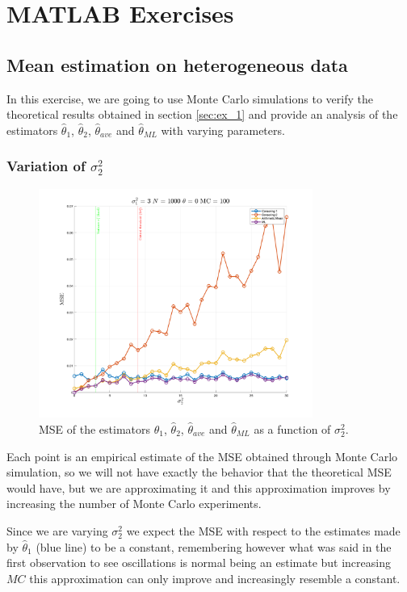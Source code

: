 \chapter{MATLAB Exercises}
\section{Mean estimation on heterogeneous data}
In this exercise, we are going to use Monte Carlo simulations to verify the theoretical results obtained in section \ref{sec:ex_1} and provide an analysis of the estimators $\hat\theta_1$, $\hat\theta_2$, $\hat\theta_{ave}$ and $\hat\theta_{ML}$ with varying parameters.

\subsection*{Variation of $\sigma_2^2$}
\begin{figure}[H]
    \centering
    \includegraphics[width=0.8\textwidth]{./figures/appendix_a/figure_1.png}
    \caption{MSE of the estimators $\hat\theta_1$, $\hat\theta_2$, $\hat\theta_{ave}$ and $\hat\theta_{ML}$ as a function of $\sigma_2^2$.}
    \label{fig:mean_estimation_heterogeneous_data}
\end{figure}

Each point is an empirical estimate of the MSE obtained through Monte Carlo simulation, so we will not have exactly the behavior that the theoretical MSE would have, but we are approximating it and this approximation improves by increasing the number of Monte Carlo experiments.

Since we are varying $\sigma_2^2$ we expect the MSE with respect to the estimates made by $\hat \theta _1$ (blue line) to be a constant, remembering however what was said in the first observation to see oscillations is normal being an estimate but increasing $MC$ this approximation can only improve and increasingly resemble a constant.

